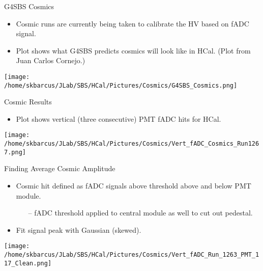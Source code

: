 \documentclass[10pt]{beamer}
\begin{document}
\begin{frame}{G4SBS Cosmics}

	\begin{itemize}
		\item Cosmic runs are currently being taken to calibrate the HV based on fADC signal.
		\item Plot shows what G4SBS predicts cosmics will look like in HCal. (Plot from Juan Carlos Cornejo.)
	\end{itemize}
	
	\begin{center}
	\texttt{[image: /home/skbarcus/JLab/SBS/HCal/Pictures/Cosmics/G4SBS\_Cosmics.png]}
	\end{center}

\end{frame}

\begin{frame}{Cosmic Results}

	\begin{itemize}
		\item Plot shows vertical (three consecutive) PMT fADC hits for HCal.
	\end{itemize}

	\begin{center}
	\texttt{[image: /home/skbarcus/JLab/SBS/HCal/Pictures/Cosmics/Vert\_fADC\_Cosmics\_Run1267.png]}
	\end{center}

\end{frame}

\begin{frame}{Finding Average Cosmic Amplitude}

	\begin{itemize}
		\item Cosmic hit defined as fADC signals above threshold above and below PMT module.
		\begin{itemize}
			\item[--] fADC threshold applied to central module as well to cut out pedestal.
		\end{itemize}
		\item Fit signal peak with Gaussian (skewed).
	\end{itemize}

	\begin{center}
	\texttt{[image: /home/skbarcus/JLab/SBS/HCal/Pictures/Cosmics/Vert\_fADC\_Run\_1263\_PMT\_117\_Clean.png]}
	\end{center}

\end{frame}
\end{document}
